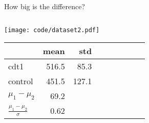 \documentclass[compress]{beamer}
\begin{document}
\begin{frame}{How big is the difference?}


    \begin{columns}
        \begin{column}{0.33\linewidth}

            \texttt{[image: code/dataset2.pdf]}

            \begin{center}
                \tiny
                \begin{tabular}{lrrrrrrrr}
                    \toprule
                    {} &  mean &         std\\ \midrule
                    cdt1      &   516.5 & 85.3 \\
                    control   &   451.5 & 127.1\\ \midrule
                    $\mu_1 - \mu_2$ & 69.2 & \only<5->{\\
                    $\frac{\mu_1 - \mu_2}{\sigma}$ & 0.62 &} \\
                    \bottomrule
                \end{tabular}
            \end{center}

        \end{column}
        \begin{column}{0.33\linewidth}

        \end{column}
        \begin{column}{0.33\linewidth}
\end{column}
\end{columns}
\end{frame}
\end{document}
